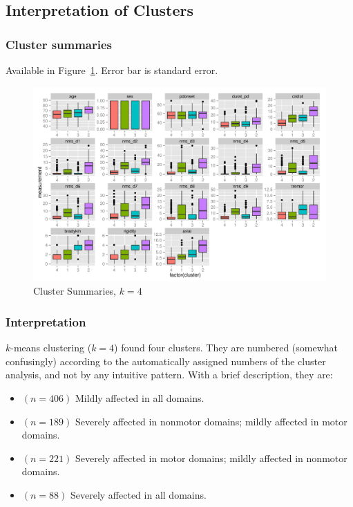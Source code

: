 \documentclass[letterpaper,12pt]{article}
\begin{document}
\subsection{Interpretation of Clusters}

\subsubsection{Cluster summaries}

Available in Figure~\ref{fig:kmeans-summaries-4}. Error bar is standard error.

\begin{figure}[h]
  \centering
  \includegraphics[width=\linewidth]{kmeans-summaries-4.pdf}
  \caption{Cluster Summaries, $k = 4$}
  \label{fig:kmeans-summaries-4}
\end{figure}

\subsubsection{Interpretation}
$k$-means clustering ($k = 4$) found four clusters. They are numbered (somewhat
confusingly) according to the automatically assigned numbers of the cluster
analysis, and not by any intuitive pattern. With a brief description, they are:

\begin{itemize}
  \item[4.] $(n = 406)$ Mildly affected in all domains.
  \item[1.] $(n = 189)$ Severely affected in nonmotor domains; mildly
    affected in motor domains.
  \item[3.] $(n = 221)$ Severely affected in motor domains; mildly
    affected in nonmotor domains.
  \item[2.] $(n = 88)$ Severely affected in all domains.
\end{itemize}
\end{document}
